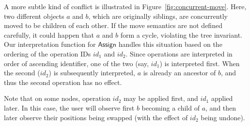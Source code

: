 A more subtle kind of conflict is illustrated in Figure~\ref{fig:concurrent-move}.
Here, two different objects $a$ and $b$, which are originally siblings, are concurrently moved to be children of each other.
If the move semantics are not defined carefully, it could happen that $a$ and $b$ form a cycle, violating the tree invariant.
Our interpretation function for $\mathsf{Assign}$ handles this situation based on the ordering of the operation IDs $\mathit{id}_1$ and $\mathit{id}_2$.
Since operations are interpreted in order of ascending identifier, one of the two (say, $\mathit{id}_1$) is interpreted first.
When the second ($\mathit{id}_2$) is subsequently interpreted, $a$ is already an ancestor of $b$, and thus the second operation has no effect.

Note that on some nodes, operation $\mathit{id}_2$ may be applied first, and $\mathit{id}_1$ applied later.
In this case, the user will observe first $b$ becoming a child of $a$, and then later observe their positions being swapped (with the effect of $\mathit{id}_2$ being undone).
